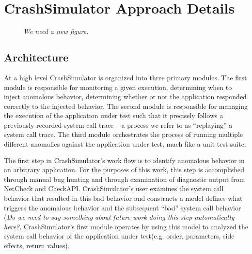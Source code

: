 \section{CrashSimulator Approach Details}
    \begin{figure}[t]
        \center{}
        \caption{\emph{We need a new figure.}}

    \end{figure}

    \subsection{Architecture}
        
    At a high level CrashSimulator is organized into three primary modules. The first module is responsible for
    monitoring a given execution, determining when to inject anomalous behavior, determining whether or not the
    application responded correctly to the injected behavior. The second module is responsible for managing the
    execution of the application under test such that it precisely follows a previously recorded system call trace -- a
    process we refer to as ``replaying'' a system call trace. The third module orchestrates the process of running
    multiple different anomalies against the application under test, much like a unit test suite.
        
    The first step in CrashSimulator's work flow is to identify anomalous behavior in an arbitrary application. For the
    purposes of this work, this step is accomplished through manual bug hunting and through examination of diagnostic
    output from NetCheck and CheckAPI. CrashSimulator's user examines the system call behavior that resulted in this bad
    behavior and constructs a model defines what triggers the anomalous behavior and the subsequent ``bad'' system call
    behavior (\emph{Do we need to say something about future work doing this step automatically here?}.
    CrashSimulator's first module operates by using this model to analyzed the system call behavior of the application
    under test(e.g. order, parameters, side effects, return values).
        
